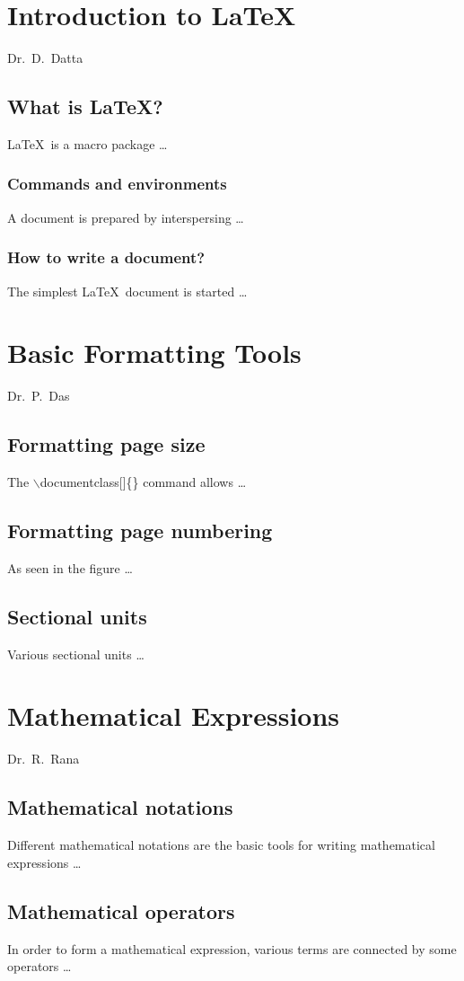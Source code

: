 \documentclass[a4paper,openany]{book}
\begin{document}
\dominitoc
\tableofcontents
%
\chapter[Introduction to \LaTeX\\{\it Dr.\ D.\ Datta}]{Introduction to \LaTeX}
\begin{flushright} Dr.\ D.\ Datta \end{flushright}
\minitoc
\section{What is \LaTeX?}
\LaTeX\ is a macro package …
\subsection{Commands and environments}
A document is prepared by interspersing …
\subsection{How to write a document?}
The simplest \LaTeX\ document is started …
%
\chapter[Basic Formatting Tools\\{\it Dr.\ P.\ Das}]{Basic Formatting Tools}
\begin{flushright} Dr.\ P.\ Das \end{flushright}
\minitoc
\section{Formatting page size}
The $\backslash$documentclass[]\{\} command allows …
\section{Formatting page numbering}
As seen in the figure …
\section{Sectional units}
Various sectional units …
%
\chapter[Mathematical Expressions\\{\it Dr.\ R.\ Rana}]{Mathematical Expressions}
\begin{flushright} Dr.\ R.\ Rana \end{flushright}
\minitoc
\section{Mathematical notations}
Different mathematical notations are the basic tools for writing mathematical expressions …
\section{Mathematical operators}
In order to form a mathematical expression, various terms are connected by some operators …
\end{document}
